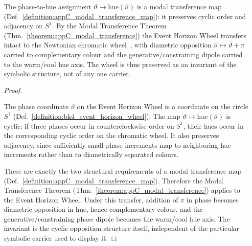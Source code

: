 \begin{corollary}
\label{corollary:bk4_chromatic_transference_of_wheel}
The phase-to-hue assignment $\vartheta\mapsto\mathrm{hue}(\vartheta)$ is a modal
transference map (Def.~\ref{definition:appC_modal_transference_map}): it preserves
cyclic order and adjacency on $S^1$. By the Modal Transference Theorem
(Thm.~\ref{theorem:appC_modal_transference}) the Event Horizon Wheel transfers
intact to the Newtonian chromatic wheel~\cite{newton1704opticks}, with diametric opposition
$\vartheta\mapsto\vartheta+\pi$ carried to complementary colour and the
generative/constraining dipole carried to the warm/cool hue axis. The wheel is thus
preserved as an invariant of the symbolic structure, not of any one carrier.
\end{corollary}

\begin{proof}
\label{proof:bk4_chromatic_transference_of_wheel}
\leavevmode

The phase coordinate $\vartheta$ on the Event Horizon Wheel is a coordinate on
the circle $S^1$ (Def.~\ref{definition:bk4_event_horizon_wheel}). The map
$\vartheta\mapsto\mathrm{hue}(\vartheta)$ is cyclic: if three phases occur in
counterclockwise order on $S^1$, their hues occur in the corresponding cyclic
order on the chromatic wheel. It also preserves adjacency, since sufficiently
small phase increments map to neighboring hue increments rather than to
diametrically separated colours.

These are exactly the two structural requirements of a modal transference map
(Def.~\ref{definition:appC_modal_transference_map}). Therefore the Modal
Transference Theorem (Thm.~\ref{theorem:appC_modal_transference}) applies to
the Event Horizon Wheel. Under this transfer, addition of $\pi$ in phase becomes
diametric opposition in hue, hence complementary colour, and the
generative/constraining phase dipole becomes the warm/cool hue axis. The
invariant is the cyclic opposition structure itself, independent of the
particular symbolic carrier used to display it.
\end{proof}

